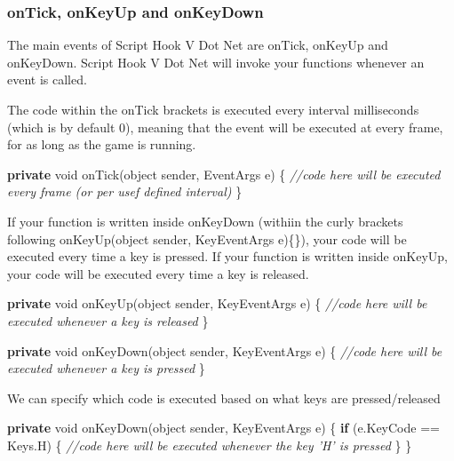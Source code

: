 \documentclass[
  openany]{book}
\newenvironment{Shaded}{\begin{snugshade}}{\end{snugshade}}
\newcommand{\CommentTok}[1]{\textcolor[rgb]{0.56,0.35,0.01}{\textit{#1}}}
\newcommand{\DataTypeTok}[1]{\textcolor[rgb]{0.13,0.29,0.53}{#1}}
\newcommand{\FunctionTok}[1]{\textcolor[rgb]{0.00,0.00,0.00}{#1}}
\newcommand{\KeywordTok}[1]{\textcolor[rgb]{0.13,0.29,0.53}{\textbf{#1}}}
\newcommand{\NormalTok}[1]{#1}
\begin{document}
\hypertarget{ontick-onkeyup-and-onkeydown}{%
\subsubsection*{onTick, onKeyUp and onKeyDown}\label{ontick-onkeyup-and-onkeydown}}

The main events of Script Hook V Dot Net are onTick, onKeyUp and onKeyDown. Script Hook V Dot Net will invoke your functions whenever an event is called.

The code within the onTick brackets is executed every interval milliseconds (which is by default 0), meaning that the event will be executed at every frame, for as long as the game is running.

\begin{Shaded}
\begin{Highlighting}[]
 \KeywordTok{private} \DataTypeTok{void} \FunctionTok{onTick}\NormalTok{(}\DataTypeTok{object}\NormalTok{ sender, EventArgs e)}
\NormalTok{ \{}
        \CommentTok{//code here will be executed every frame (or per usef defined interval)}
\NormalTok{ \}}
\end{Highlighting}
\end{Shaded}

If your function is written inside onKeyDown (withiin the curly brackets following onKeyUp(object sender, KeyEventArgs e)\{\}), your code will be executed every time a key is pressed. If your function is written inside onKeyUp, your code will be executed every time a key is released.

\begin{Shaded}
\begin{Highlighting}[]
\KeywordTok{private} \DataTypeTok{void} \FunctionTok{onKeyUp}\NormalTok{(}\DataTypeTok{object}\NormalTok{ sender, KeyEventArgs e)}
\NormalTok{\{}
      \CommentTok{//code here will be executed whenever a key is released}
\NormalTok{\}}

\KeywordTok{private} \DataTypeTok{void} \FunctionTok{onKeyDown}\NormalTok{(}\DataTypeTok{object}\NormalTok{ sender, KeyEventArgs e)}
\NormalTok{\{}
      \CommentTok{//code here will be executed whenever a key is pressed}
\NormalTok{\} }
\end{Highlighting}
\end{Shaded}

We can specify which code is executed based on what keys are pressed/released

\begin{Shaded}
\begin{Highlighting}[]
\KeywordTok{private} \DataTypeTok{void} \FunctionTok{onKeyDown}\NormalTok{(}\DataTypeTok{object}\NormalTok{ sender, KeyEventArgs e)}
\NormalTok{\{}
    \KeywordTok{if}\NormalTok{ (e.}\FunctionTok{KeyCode}\NormalTok{ == Keys.}\FunctionTok{H}\NormalTok{)}
\NormalTok{    \{}
        \CommentTok{//code here will be executed whenever the key 'H' is pressed }
\NormalTok{    \}}
\NormalTok{\} }
\end{Highlighting}
\end{Shaded}
\end{document}
